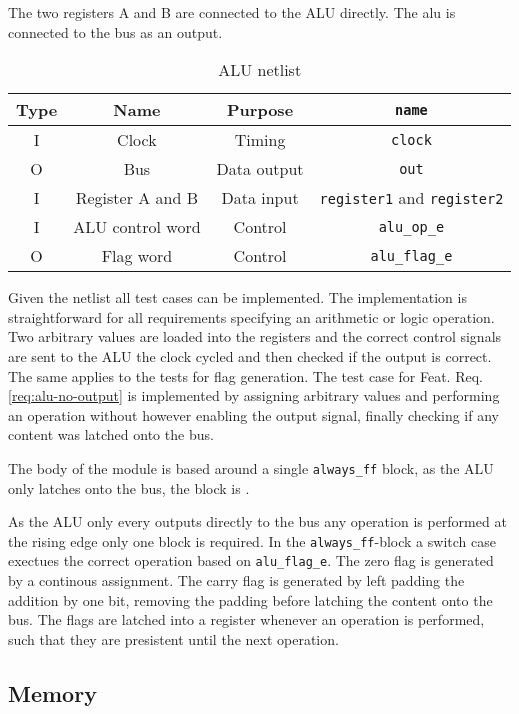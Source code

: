 The two registers A and B are connected to the ALU directly. The alu is connected to the bus as an output. 

\begin{table}[H]
\begin{tabular}{cccc}
  Type& Name & Purpose & \texttt{name}\\ \hline
  I   & Clock & Timing & \texttt{clock}\\
  O   & Bus     & Data output & \texttt{out}        \\
  I   & Register A and B & Data input & \texttt{register1} and \texttt{register2} \\
  I   & ALU control word & Control & \texttt{alu\_op\_e}\\
O   & Flag word & Control & \texttt{alu\_flag\_e}
\end{tabular}
\caption{ALU netlist}
\label{tab:alu-i/o}
\end{table}

Given the netlist all test cases can be implemented. The implementation is straightforward for all requirements specifying an arithmetic or logic operation. Two arbitrary values are loaded into the registers and the correct control signals are sent to the ALU the clock cycled and then checked if the output is correct. The same applies to the tests for flag generation. The test case for Feat. Req. \ref{req:alu-no-output} is implemented by assigning arbitrary values and performing an operation without however enabling the output signal, finally checking if any content was latched onto the bus.  

The body of the module is based around a single \texttt{always\_ff} block, as the ALU only latches onto the bus, the block is \texttt{\@posedge}.

As the ALU only every outputs directly to the bus any operation is performed at the rising edge only one block is required. In the \texttt{always\_ff}-block a switch case exectues the correct operation based on \texttt{alu\_flag\_e}. The zero flag is generated by a continous assignment. The carry flag is generated by left padding the addition by one bit, removing the padding before latching the content onto the bus. The flags are latched into a register whenever an operation is performed, such that they are presistent until the next operation.


% 

\subsection{Memory}

